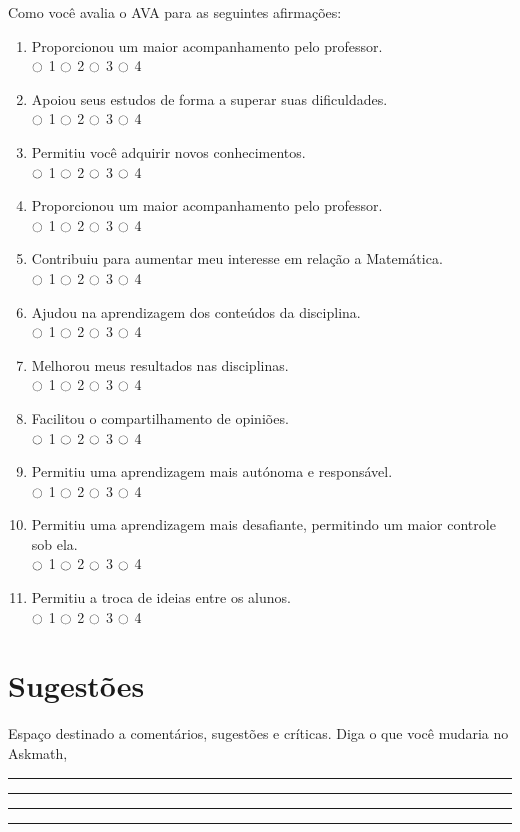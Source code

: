 \noindent
Como você avalia o AVA para as seguintes afirmações:\\
\begin{enumerate}
  \item  Proporcionou um maior acompanhamento pelo professor. \\
  $\ocircle$ 1  $\ocircle$ 2 $\ocircle$ 3 $\ocircle$ 4
  \item  Apoiou seus estudos de forma a superar suas dificuldades. \\
  $\ocircle$ 1  $\ocircle$ 2 $\ocircle$ 3 $\ocircle$ 4
   \item  Permitiu você adquirir novos conhecimentos. \\
  $\ocircle$ 1  $\ocircle$ 2 $\ocircle$ 3 $\ocircle$ 4
  \item  Proporcionou um maior acompanhamento pelo professor. \\
  $\ocircle$ 1  $\ocircle$ 2 $\ocircle$ 3 $\ocircle$ 4
  \item  Contribuiu para aumentar meu interesse em relação a Matemática. \\
  $\ocircle$ 1  $\ocircle$ 2 $\ocircle$ 3 $\ocircle$ 4
  \item  Ajudou na aprendizagem dos conteúdos da disciplina. \\
  $\ocircle$ 1  $\ocircle$ 2 $\ocircle$ 3 $\ocircle$ 4
  \item  Melhorou meus resultados nas disciplinas. \\
  $\ocircle$ 1  $\ocircle$ 2 $\ocircle$ 3 $\ocircle$ 4
  \item  Facilitou o compartilhamento de opiniões. \\
  $\ocircle$ 1  $\ocircle$ 2 $\ocircle$ 3 $\ocircle$ 4
  \item  Permitiu uma aprendizagem mais autónoma e responsável.  \\
  $\ocircle$ 1  $\ocircle$ 2 $\ocircle$ 3 $\ocircle$ 4
  \item  Permitiu uma aprendizagem mais desafiante, permitindo um maior controle sob ela.   \\
  $\ocircle$ 1  $\ocircle$ 2 $\ocircle$ 3 $\ocircle$ 4
  \item  Permitiu a troca de ideias entre os alunos.  \\
  $\ocircle$ 1  $\ocircle$ 2 $\ocircle$ 3 $\ocircle$ 4
  
\end{enumerate}

\section{Sugestões}

Espaço destinado a comentários, sugestões e críticas. Diga o que você mudaria no Askmath, 

 \noindent\rule{\textwidth}{0.4pt}
 \noindent\rule{\textwidth}{0.4pt}
 \noindent\rule{\textwidth}{0.4pt}
 \noindent\rule{\textwidth}{0.4pt}

